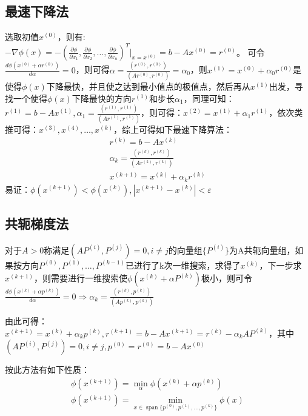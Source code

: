 \documentclass[a4paper]{article}
\DeclareMathOperator{\spn}{span}
\begin{document}
\subsection{最速下降法}
选取初值$x^{(0)} $，则有:$-\nabla \phi(x)=-(\frac{\partial \phi}{\partial x_1}, \frac{\partial \phi}{\partial x_2}, \dots, \frac{\partial \phi}{\partial x_n})^T|_{x=x^{(0)}} =b-Ax^{(0)}=r^{(0)} $。
可令$\frac{d\phi(x^{(0)}+\alpha r^{(0)})}{d\alpha}=0$，则可得$\alpha = \frac{(r^{(0)}, r^{(0)})}{(Ar^{(0)}, r^{(0)})}=\alpha_0$，则$x^{(1)}=x^{(0)}+\alpha_0r^{(0)} $是
使得$\phi(x)$下降最快，并且使之达到最小值点的极值点，然后再从$x^{(1)}$出发，寻找一个使得$\phi(x)$下降最快的方向$r^{(1)} $和步长$\alpha_1$，同理可知：
$r^{(1)}=b-Ax^{(1)},\alpha_1=\frac{(r^{(1)}, r^{(1)})}{(Ar^{(1)}, r^{(1)})} $，则可得：$x^{(2)}=x^{(1)}+\alpha_1r^{(1)}$，依次类推可得：$x^{(3)}, x^{(4)}, \dots, x^{(k)}$，综上可得如下最速下降算法：
\begin{equation}
  \begin{array}{lr}
    r^{(k)}=b-Ax^{(k)} \\
    \alpha_k = \frac{(r^{(k)}, r^{(k)})}{(Ar^{(k)}, r^{(k)})} \\
    x^{(k+1)}=x^{(k)}+\alpha_kr^{(k)}
  \end{array}
\end{equation}
易证：$\phi(x^{(k+1)}) < \phi(x^{(k)}),|x^{(k+1)}-x^{(k)}|<\varepsilon$

\subsection{共轭梯度法}
对于$A>0$称满足$(AP^{(i)}, P^{(j)})=0, i\neq j$的向量组$\{P^{(i)}\}$为A共轭向量组，如果按方向$P^{(0)}, P^{(1)}, \dots, P^{(k-1)}$已进行了k次一维搜索，求得了$x^{(k)} $，下一步求
$x^{(k+1)} $，则需要进行一维搜索使$\phi(x^{(k)}+\alpha P^{(k)}) $极小，则可令$\frac{d\phi(x^{(k)}+\alpha p^{(k)})}{d\alpha}=0 \Rightarrow \alpha_k = \frac{(r^{(k)}, p^{(k)})}{(Ap^{(k)}, p^{(k)})}$

由此可得：$x^{(k+1)}=x^{(k)}+\alpha_kp^{(k)}, r^{(k+1)}=b-Ax^{(k+1)}=r^{(k)}-\alpha_kAP^{(k)} $，其中$(AP^{(i)}, P^{(j)})=0, i\neq j, p^{(0)}=r^{(0)}=b-Ax^{(0)} $

按此方法有如下性质：
\begin{equation*}
  \begin{array}{lr}
    \phi(x^{(k+1)})=\min_\alpha\phi(x^{(k)}+\alpha p^{(k)}) \\
    \phi(x^{(k+1)}) = \min_{x\in \spn\{p^{(0)}, p^{(1)}, \dots, p^{(k)} \}} \phi(x)
  \end{array}
\end{equation*}
\end{document}
